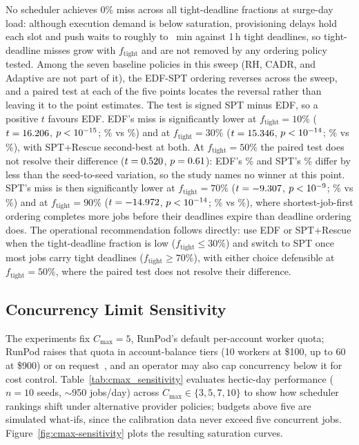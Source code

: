{No scheduler achieves 0\% miss across all tight-deadline fractions at surge-day load: although execution demand is below saturation, provisioning delays hold each slot and push waits to roughly \SensSrgWaitLo{} to \SensSrgWaitHi{}~min against 1\,h tight deadlines, so tight-deadline misses grow with $f_{\text{tight}}$ and are not removed by any ordering policy tested. Among the seven baseline policies in this sweep (RH, CADR, and Adaptive are not part of it), the EDF-SPT ordering reverses across the sweep, and a paired test at each of the five points locates the reversal rather than leaving it to the point estimates. The test is signed SPT minus EDF, so a positive $t$ favours EDF. EDF's miss is significantly lower at $f_{\text{tight}} = 10\%$ ($t=16.206$, $p<10^{-15}$; \DlTenEDFmiss\% vs \DlTenSPTmiss\%) and at $f_{\text{tight}} = 30\%$ ($t=15.346$, $p<10^{-14}$; \DlThirtyEDFmiss\% vs \DlThirtySPTmiss\%), with SPT+Rescue second-best at both. At $f_{\text{tight}} = 50\%$ the paired test does not resolve their difference ($t=0.520$, $p=0.61$): EDF's \DlFiftyEDFmiss\% and SPT's \DlFiftySPTmiss\% differ by less than the seed-to-seed variation, so the study names no winner at this point. SPT's miss is then significantly lower at $f_{\text{tight}} = 70\%$ ($t=-9.307$, $p<10^{-9}$; \DlSeventySPTmiss\% vs \DlSeventyEDFmiss\%) and at $f_{\text{tight}} = 90\%$ ($t=-14.972$, $p<10^{-14}$; \DlNinetySPTmiss\% vs \DlNinetyEDFmiss\%), where shortest-job-first ordering completes more jobs before their deadlines expire than deadline ordering does. The operational recommendation follows directly: use EDF or SPT+Rescue when the tight-deadline fraction is low ($f_{\text{tight}} \leq 30\%$) and switch to SPT once most jobs carry tight deadlines ($f_{\text{tight}} \geq 70\%$), with either choice defensible at $f_{\text{tight}} = 50\%$, where the paired test does not resolve their difference.

\subsection{Concurrency Limit Sensitivity}
\label{ssec:concurrency-limit-sensitivity}

The experiments fix $C_{\max}=5$, RunPod's default per-account worker quota; RunPod raises that quota in account-balance tiers (10 workers at \$100, up to 60 at \$900) or on request~\cite{runpod2026maxworkers}, and an operator may also cap concurrency below it for cost control. Table~\ref{tab:cmax_sensitivity} evaluates hectic-day performance ($n=10$ seeds, $\sim$950 jobs/day) across $C_{\max} \in \{3, 5, 7, 10\}$ to show how scheduler rankings shift under alternative provider policies; budgets above five are simulated what-ifs, since the calibration data never exceed five concurrent jobs. Figure~\ref{fig:cmax-sensitivity} plots the resulting saturation curves.

}
